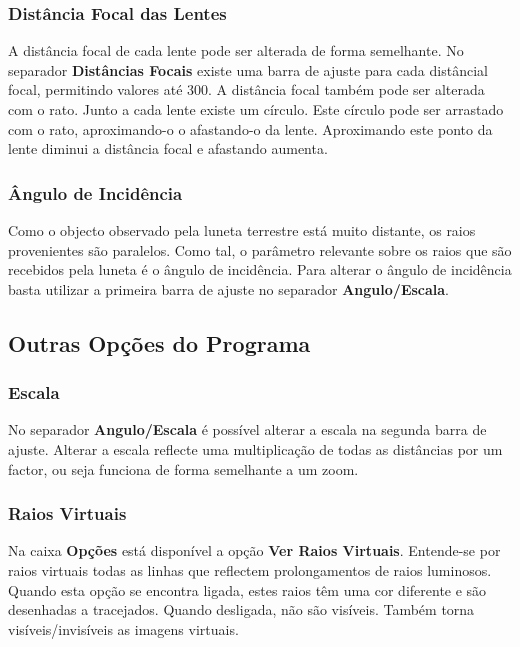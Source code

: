 \documentclass{scrartcl}
\begin{document}
\subsubsection{Distância Focal das Lentes}

A distância focal de cada lente pode ser alterada de forma semelhante. No separador {\bf Distâncias Focais} existe uma barra de ajuste para cada distâncial focal, permitindo valores até 300.
A distância focal também pode ser alterada com o rato. Junto a cada lente existe um círculo. Este círculo pode ser arrastado com o rato, aproximando-o o afastando-o da lente. Aproximando este ponto da lente diminui a distância focal e afastando aumenta.
\par 

\subsubsection{Ângulo de Incidência}

Como o objecto observado pela luneta terrestre está muito distante, os raios provenientes são paralelos. Como tal, o parâmetro relevante sobre os raios que são recebidos pela luneta é o ângulo de incidência. Para alterar o ângulo de incidência basta utilizar a primeira barra de ajuste no separador {\bf Angulo/Escala}.

\subsection{Outras Opções do Programa}

\subsubsection{Escala}

No separador {\bf Angulo/Escala} é possível alterar a escala na segunda barra de ajuste. Alterar a escala reflecte uma multiplicação de todas as distâncias por um factor, ou seja funciona de forma semelhante a um zoom.
\par

\subsubsection{Raios Virtuais}

Na caixa {\bf Opções} está disponível a opção {\bf Ver Raios Virtuais}. Entende-se por raios virtuais todas as linhas que reflectem prolongamentos de raios luminosos. Quando esta opção se encontra ligada, estes raios têm uma cor diferente e são desenhadas a tracejados. Quando desligada, não são visíveis. Também torna visíveis/invisíveis as imagens virtuais.
\par
\end{document}
